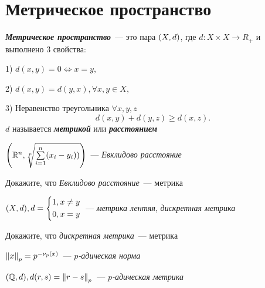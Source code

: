 \documentclass{article}
\begin{document}
    \section{Метрическое пространство}
    \begin{definition_boxed}
        \textit{\textbf{Метрическое пространство}}~--- это пара $\lr*{X, d}$, где $d : X \times X \rightarrow R_+$ и выполнено 3 свойства:

        1) $d(x, y) = 0 \Leftrightarrow x = y,$

        2) $d(x, y) = d(y, x), \forall x, y \in X,$

        3) Неравенство треугольника $\forall x, y, z$
        \[
            d(x, y) + d(y, z) \geqslant d(x, z).
        \]
        $d$ называется \textbf{\textit{метрикой}} или \textbf{\textit{расстоянием}}
    \end{definition_boxed}

    \begin{example}
        $\lr*{\R^n, \sqrt[p]{\sum\limits_{i=1}^{n}\lr*{x_i - y_i})}}$~--- \textit{Евклидово расстояние}
    \end{example}

    \begin{task_boxed}
        Докажите, что \textit{Евклидово расстояние}~--- метрика
    \end{task_boxed}

    \begin{example}
        $\lr*{X, d}, d =
        \begin{cases*}
            1, x \neq y \\
            0, x = y
        \end{cases*}$~---
        \textit{метрика лентяя}, \textit{дискретная метрика}
    \end{example}

    \begin{task_boxed}
        Докажите, что \textit{дискретная метрика}~--- метрика
    \end{task_boxed}

    \begin{definition_boxed}
        $\norm*{x}_p = p ^ {-\nu_p(x)}$~--- \textit{$p$-адическая норма}
    \end{definition_boxed}

    \begin{example}
        $\lr*{\Q, d}, d(r, s) = \norm*{r - s}_p$~---
        \textit{$p$-адическая метрика}
    \end{example}
\end{document}
